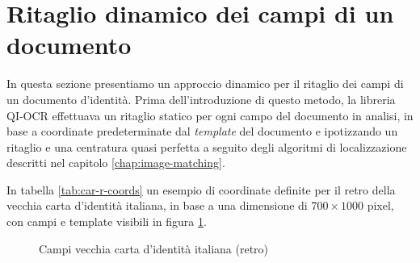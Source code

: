 \section{Ritaglio dinamico dei campi di un documento}
In questa sezione presentiamo un approccio dinamico per il ritaglio dei campi di un documento d'identit\`a. Prima dell'introduzione di questo metodo, la libreria QI-OCR effettuava un ritaglio statico per ogni campo del documento in analisi, in base a coordinate predeterminate dal \textit{template} del documento e ipotizzando un ritaglio e una centratura quasi perfetta a seguito degli algoritmi di localizzazione descritti nel capitolo \ref{chap:image-matching}.\par
In tabella \ref{tab:car-r-coords} un esempio di coordinate definite per il retro della vecchia carta d'identit\`a italiana, in base a una dimensione di $700 \times 1000$ pixel, con campi e template visibili in figura \ref{fig:car-r-template}.\par
\begin{figure}[h]
	\centering
	\caption{Campi vecchia carta d'identit\`a italiana (retro)} \label{fig:car-r-template}
\end{figure}
